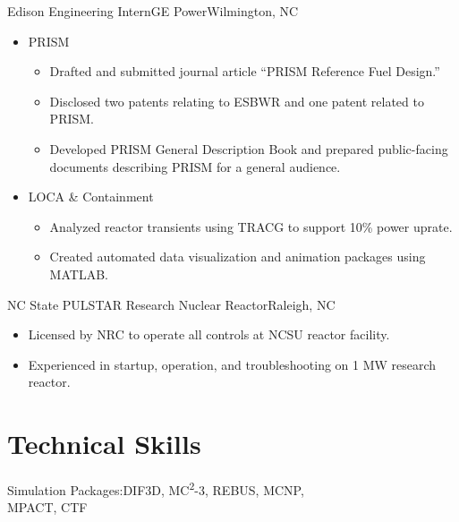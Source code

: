 \documentclass[letterpaper,12pt,nocolor,final]{moderncv}
\begin{document}
{Edison Engineering Intern}{GE Power}{Wilmington, NC}{}{
  \begin{itemize}
    \item PRISM 
    \begin{itemize}
      \item Drafted and submitted journal article ``PRISM Reference Fuel Design.''
      \item Disclosed two patents relating to ESBWR and one patent related to PRISM.
      \item Developed PRISM General Description Book and prepared public-facing documents describing PRISM for a general audience.
    \end{itemize}
    \item LOCA \& Containment 
    \begin{itemize}
      \item Analyzed reactor transients using TRACG to support 10\% power uprate.
      \item Created automated data visualization and animation packages using MATLAB.
    \end{itemize}
  \end{itemize}}

{NC State PULSTAR Research Nuclear Reactor}{Raleigh, NC}{}{
  \begin{itemize}
    \item Licensed by NRC to operate all controls at NCSU reactor facility.
    \item Experienced in startup, operation, and troubleshooting on 1 MW
      research reactor.
  \end{itemize}}


\clearpage
\section{Technical Skills}

{Simulation Packages:}{DIF3D, MC\textsuperscript{2}-3, REBUS, MCNP, \\
  MPACT, CTF}
\end{document}
